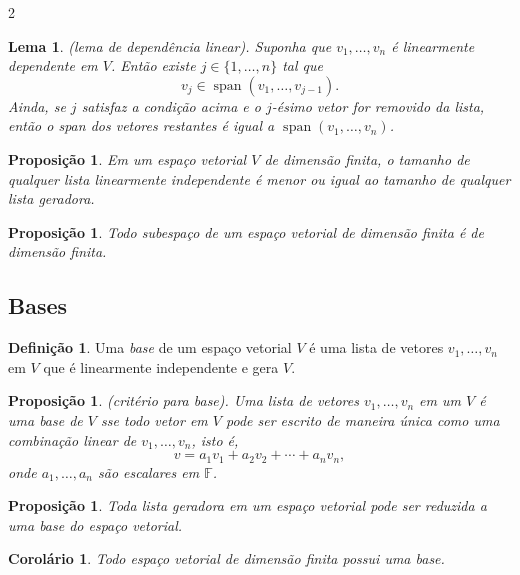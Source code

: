 \documentclass{article}
\theoremstyle{plain}
\newtheorem{prop}[thm]{Proposição}
\newtheorem{lem}[thm]{Lema}
\newtheorem{cor}[thm]{Corolário}
\theoremstyle{definition}
\newtheorem{defn}{Definição}[section]
\theoremstyle{remark}
\DeclareMathOperator{\spn}{span}
\begin{document}
\begin{multicols}{2}
\begin{lem} (lema de dependência linear).
    Suponha que \(v_1, \ldots, v_n\) é linearmente dependente em \(V\). Então existe \(j \in \{1, \ldots, n\}\) tal que
    \begin{equation}
        v_j \in \spn(v_1, \ldots, v_{j-1}).
    \end{equation}
    \noindent Ainda, se \(j\) satisfaz a condição acima e o \(j\)-ésimo vetor for removido da lista, então o span dos vetores restantes é igual a \(\spn(v_1, \ldots, v_n)\).
\end{lem}

\begin{prop}
    Em um espaço vetorial \(V\) de dimensão finita, o tamanho de qualquer lista linearmente independente é menor ou igual ao tamanho de qualquer lista geradora.
\end{prop}

\begin{prop}
    Todo subespaço de um espaço vetorial de dimensão finita é de dimensão finita.
\end{prop}

\subsection{Bases}
\begin{defn}
    Uma \emph{base} de um espaço vetorial \(V\) é uma lista de vetores \(v_1, \ldots, v_n\) em \(V\) que é linearmente independente e gera \(V\).
\end{defn}

\begin{prop} (critério para base).
    Uma lista de vetores \(v_1, \ldots, v_n\) em um \(V\) é uma base de \(V\) sse todo vetor em \(V\) pode ser escrito de maneira única como uma combinação linear de \(v_1, \ldots, v_n\), isto é,
    \begin{equation}
        v = a_1 v_1 + a_2 v_2 + \cdots + a_n v_n,
    \end{equation}
    \noindent onde \(a_1, \ldots, a_n\) são escalares em \(\mathbb{F}\).
\end{prop}

\begin{prop}
    Toda lista geradora em um espaço vetorial pode ser reduzida a uma base do espaço vetorial.
\end{prop}

\begin{cor}
    Todo espaço vetorial de dimensão finita possui uma base.
\end{cor}


\end{multicols}
\end{document}
